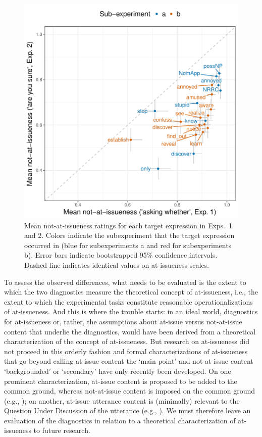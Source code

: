 \documentclass[11pt,fleqn]{article}
\newcommand{\6}{\mbox{$[\hspace*{-.6mm}[$}}
\newcommand{\9}{\mbox{$]\hspace*{-.6mm}]$}}
\begin{document}
\begin{figure}[!h]
\begin{center}

\includegraphics[width=12cm]{../results/ai-meta-analysis/graphs/correlation-bytrigger}

\end{center}
\caption{Mean not-at-issueness ratings for each target expression in Exps.~1 and 2. Colors indicate the subexperiment that the target expression occurred in (blue for subexperiments a and red for subexperiments b). Error bars indicate bootstrapped 95\% confidence intervals. Dashed line indicates identical values on at-issueness scales.}
\label{fig:ai-correlation}
\end{figure}


To assess the observed differences, what needs to be evaluated is the extent to which the two diagnostics measure the theoretical concept of at-issueness, i.e., the extent to which the experimental tasks constitute reasonable operationalizations of at-issueness. And this is where the trouble starts: in an ideal world, diagnostics for at-issueness or, rather, the assumptions about at-issue versus not-at-issue content that underlie the diagnostics, would have been derived from a theoretical characterization of the concept of at-issueness. But research on at-issueness did not proceed in this orderly fashion and formal characterizations of at-issueness that go beyond calling at-issue content the `main point' and not-at-issue content `backgrounded' or `secondary' have only recently been developed. On one prominent characterization, at-issue content is proposed to be added to the common ground, whereas not-at-issue content is imposed on the common ground (e.g., \citealt{murray2014,anderbois-etal2015}); on another, at-issue utterance content is (minimally) relevant to the Question Under Discussion of the utterance (e.g., \citealt{brst-salt10,brst-ar}). We must therefore leave an evaluation of the diagnostics in relation to a theoretical characterization of at-issueness to future research.
\end{document}
